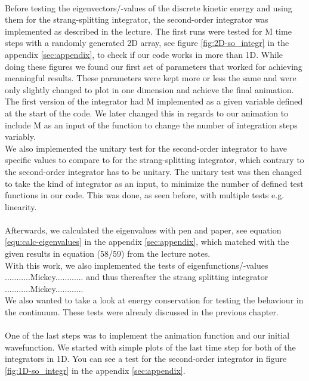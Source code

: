 \documentclass[11pt, letterpaper, onecolumn]{article}
\begin{document}
	\\
	Before testing the eigenvectors/-values of the discrete kinetic energy and using them for the strang-splitting integrator, the second-order integrator was implemented as described in the lecture. The first runs were tested for M time steps with a randomly generated 2D array, see figure \ref{fig:2D-so_integr} in the appendix \ref{sec:appendix}, to check if our code works in more than 1D. While doing these figures we found our first set of parameters that worked for achieving meaningful results. These parameters were kept more or less the same and were only slightly changed to plot in one dimension and achieve the final animation. \\
	The first version of the integrator had M implemented as a given variable defined at the start of the code. We later changed this in regards to our animation to include M as an input of the function to change the number of integration steps variably. \\
	We also implemented the unitary test for the second-order integrator to have specific values to compare to for the strang-splitting integrator, which contrary to the second-order integrator has to be unitary. The unitary test was then changed to take the kind of integrator as an input, to minimize the number of defined test functions in our code. This was done, as seen before, with multiple tests e.g. linearity.
	\\
	\\
	Afterwards, we calculated the eigenvalues with pen and paper, see equation \ref{equ:calc-eigenvalues} in the appendix \ref{sec:appendix}, which matched with the given results in equation (58/59) from the lecture notes. \\
	With this work, we also implemented the tests of eigenfunctions/-values ...........Mickey............ and thus thereafter the strang splitting integrator ...........Mickey............ \\
	We also wanted to take a look at energy conservation for testing the behaviour in the continuum. These tests were already discussed in the previous chapter.
	\\
	\\
	One of the last steps was to implement the animation function and our initial wavefunction. We started with simple plots of the last time step for both of the integrators in 1D. You can see a test for the second-order integrator in figure \ref{fig:1D-so_integr} in the appendix \ref{sec:appendix}. \\
\end{document}

